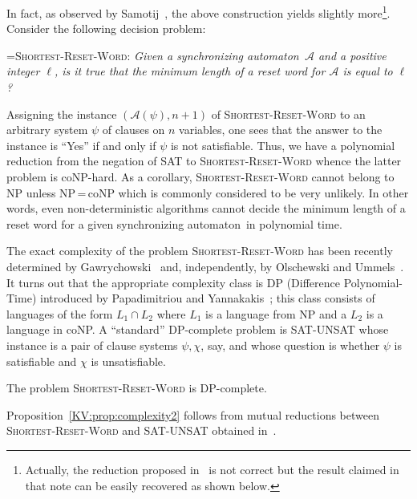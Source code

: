 \documentclass{irmaart}
\newcommand{\san}{synchronizing au\-tom\-a\-ton}
\begin{document}
In fact, as observed by Samotij~\cite{Samotij:2007}, the above
construction yields slightly more\footnote{Actually, the reduction
proposed in~\cite{Samotij:2007} is not correct but the result
claimed in that note can be easily recovered as shown below.}.
Consider the following decision
problem:

\smallskip

\hangindent=\parindent \noindent \textsc{Shortest-Reset-Word:}
\emph{Given a \san\ $\mathcal{A}$ and a positive integer $\ell$,
is it true that the minimum length of a reset word for
$\mathcal{A}$ is equal to $\ell$?}

\smallskip

\noindent Assigning the instance $(\mathcal{A}(\psi),n+1)$ of
\textsc{Shortest-Reset-Word} to an arbitrary system $\psi$ of
clauses on $n$ variables, one sees that the answer to the instance
is ``Yes'' if and only if $\psi$ is not satisfiable. Thus, we have
a polynomial reduction from the negation of \textsc{SAT} to
\textsc{Shortest-Reset-Word} whence the latter problem is
\textsf{coNP}-hard. As a corollary, \textsc{Shortest-Reset-Word}
cannot belong to \textsf{NP} unless \textsf{NP}\,=\,\textsf{coNP}
which is commonly considered to be very unlikely. In other words,
even non-deterministic algorithms cannot decide the minimum length
of a reset word for a given \san\ in polynomial time.

The exact complexity of the problem \textsc{Shortest-Reset-Word}
has been recently determined by
Gawrychowski~\cite{Gawrychowski:2008} and, independently, by
Olschewski and Ummels~\cite{Olschewski&Ummels:2010}. It turns out
that the appropriate complexity class is \textsf{DP}
(\textsf{Difference Polynomial-Time}) introduced by Papadimitriou
and Yannakakis~\cite{Papadimitriou&Yannakakis:1984}; this class
consists of languages of the form $L_1\cap L_2$ where $L_1$ is a
language from \textsf{NP} and a $L_2$ is a language in
\textsf{coNP}. A ``standard'' \textsf{DP}-complete problem is
\textsc{SAT-UNSAT} whose instance is a pair of clause systems
$\psi,\chi$, say, and whose question is whether $\psi$ is
satisfiable and $\chi$ is unsatisfiable.

\begin{proposition}
\label{KV:prop:complexity2} The problem
\textsc{Shortest-Reset-Word} is \textsf{DP}-complete.
\end{proposition}

Proposition~\ref{KV:prop:complexity2} follows from mutual
reductions between \textsc{Shortest-Reset-Word} and
\textsc{SAT-UNSAT} obtained
in~\cite{Gawrychowski:2008,Olschewski&Ummels:2010}.
\end{document}
